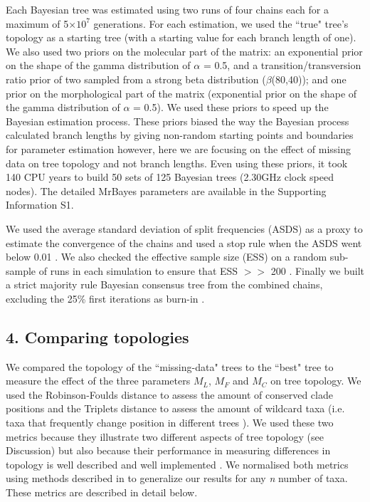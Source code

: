 \documentclass[10pt,letterpaper]{article}
\begin{document}
Each Bayesian tree was estimated using two runs of four chains each for a maximum of 5$\times$$10^7$ generations. For each estimation, we used the ``true" tree's topology as a starting tree (with a starting value for each branch length of one). We also used two priors on the molecular part of the matrix: an exponential prior on the shape of the gamma distribution of $\alpha$ = 0.5, and a transition/transversion ratio prior of two sampled from a strong beta distribution ($\beta$(80,40)); and one prior on the morphological part of the matrix (exponential prior on the shape of the gamma distribution of $\alpha$ = 0.5). We used these priors to speed up the Bayesian estimation process. These priors biased the way the Bayesian process calculated branch lengths by giving non-random starting points and boundaries for parameter estimation however, here we are focusing on the effect of missing data on tree topology and not branch lengths. Even using these priors, it took $~$ 140 CPU years to build 50 sets of 125 Bayesian trees (2.30GHz clock speed nodes). The detailed MrBayes parameters are available in the Supporting Information S1.

We used the average standard deviation of split frequencies (ASDS) as a proxy to estimate the convergence of the chains and used a stop rule when the ASDS went below 0.01 \cite{Ronquist2012mrbayes}. We also checked the effective sample size (ESS) on a random sub-sample of runs in each simulation to ensure that ESS $>>$ 200 \cite{drummond2006ess}. Finally we built a strict majority rule Bayesian consensus tree from the combined chains, excluding the 25\% first iterations as burn-in \cite{Ronquist2012mrbayes}.


\subsection*{4. Comparing topologies}
We compared the topology of the ``missing-data" trees to the ``best" tree to measure the effect of the three parameters $M_{L}$, $M_{F}$ and $M_{C}$ on tree topology. We used the Robinson-Foulds distance \cite{RF1981} to assess the amount of conserved clade positions and the Triplets distance \cite{dobson1975triplets} to assess the amount of wildcard taxa (i.e. taxa that frequently change position in different trees \cite{kearneyfragmentary2002}). We used these two metrics because they illustrate two different aspects of tree topology (see Discussion) but also because their performance in measuring differences in topology is well described \cite{Kuhner04112014} and well implemented \cite{Bogdanowicz2012}. We normalised both metrics using methods described in \cite{Bogdanowicz2012} to generalize our results for any \textit{n} number of taxa. These metrics are described in detail below.
\end{document}
